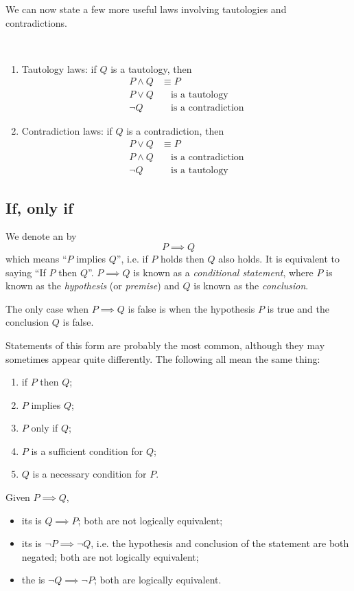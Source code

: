 We can now state a few more useful laws involving tautologies and contradictions.

\begin{lemma}\ 
\begin{enumerate}[label=(\roman*)]
\item Tautology laws: if $Q$ is a tautology, then
\begin{align*}
P\land Q&\equiv P\\
P\lor Q&\quad\text{is a tautology}\\
\lnot Q&\quad\text{is a contradiction}
\end{align*}
\item Contradiction laws: if $Q$ is a contradiction, then
\begin{align*}
P\lor Q&\equiv P\\
P\land Q&\quad\text{is a contradiction}\\
\lnot Q&\quad\text{is a tautology}
\end{align*}
\end{enumerate}
\end{lemma}
\pagebreak

\subsection{If, only if}
We denote an  by 
\[P\implies Q\]
which means ``$P$ implies $Q$'', i.e. if $P$ holds then $Q$ also holds. It is equivalent to saying ``If $P$ then $Q$''. $P \implies Q$ is known as a \emph{conditional statement}, where $P$ is known as the \emph{hypothesis} (or \emph{premise}) and $Q$ is known as the \emph{conclusion}.

The only case when $P \implies Q$ is false is when the hypothesis $P$ is true and the conclusion $Q$ is false.

Statements of this form are probably the most common, although they may sometimes appear quite differently. The following all mean the same thing:
\begin{enumerate}[label=(\roman*)]
\item if $P$ then $Q$;
\item $P$ implies $Q$;
\item $P$ only if $Q$;
\item $P$ is a sufficient condition for $Q$;
\item $Q$ is a necessary condition for $P$.
\end{enumerate}

Given $P\implies Q$,
\begin{itemize}
\item its  is $Q \implies P$; both are not logically equivalent;
\item its \vocab{inverse} is $\lnot P \implies \lnot Q$, i.e. the hypothesis and conclusion of the statement are both negated; both are not logically equivalent;
\item the \vocab{contrapositive} is $\lnot Q\implies\lnot P$; both are logically equivalent.
\end{itemize}

